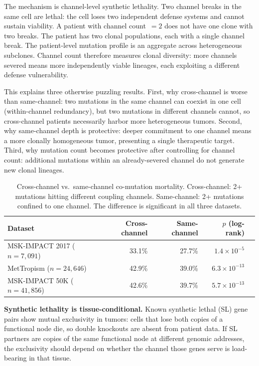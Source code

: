 \documentclass[11pt]{article}
\begin{document}
The mechanism is channel-level synthetic lethality. Two channel
breaks in the same cell are lethal: the cell loses two independent
defense systems and cannot sustain viability. A patient with
channel count~$= 2$ does not have one clone with two breaks. The
patient has two clonal populations, each with a single channel
break. The patient-level mutation profile is an aggregate across
heterogeneous subclones. Channel count therefore measures clonal
diversity: more channels severed means more independently viable
lineages, each exploiting a different defense vulnerability.

This explains three otherwise puzzling results. First, why
cross-channel is worse than same-channel: two mutations in the
same channel can coexist in one cell (within-channel redundancy),
but two mutations in different channels cannot, so cross-channel
patients necessarily harbor more heterogeneous tumors. Second, why
same-channel depth is protective: deeper commitment to one channel
means a more clonally homogeneous tumor, presenting a single
therapeutic target. Third, why mutation count becomes protective
after controlling for channel count: additional mutations within an
already-severed channel do not generate new clonal lineages.

\begin{table}[ht]
\centering
\small
\caption{Cross-channel vs.\ same-channel co-mutation mortality.
Cross-channel: 2+ mutations hitting different coupling channels.
Same-channel: 2+ mutations confined to one channel. The difference
is significant in all three datasets.}
\label{tab:cross-channel}
\begin{tabular}{@{}lrrrl@{}}
\toprule
Dataset & Cross-channel & Same-channel & $p$ (log-rank) \\
\midrule
MSK-IMPACT 2017 ($n=7{,}091$) & 33.1\% & 27.7\% &
  $1.4 \times 10^{-5}$ \\
MetTropism ($n=24{,}646$) & 42.9\% & 39.0\% &
  $6.3 \times 10^{-13}$ \\
MSK-IMPACT 50K ($n=41{,}856$) & 42.6\% & 39.7\% &
  $5.7 \times 10^{-13}$ \\
\bottomrule
\end{tabular}
\end{table}

\textbf{Synthetic lethality is tissue-conditional.}
Known synthetic lethal (SL) gene pairs show mutual exclusivity in
tumors: cells that lose both copies of a functional node die, so
double knockouts are absent from patient data. If SL partners are
copies of the same functional node at different genomic addresses,
the exclusivity should depend on whether the channel those genes
serve is load-bearing in that tissue.
\end{document}
